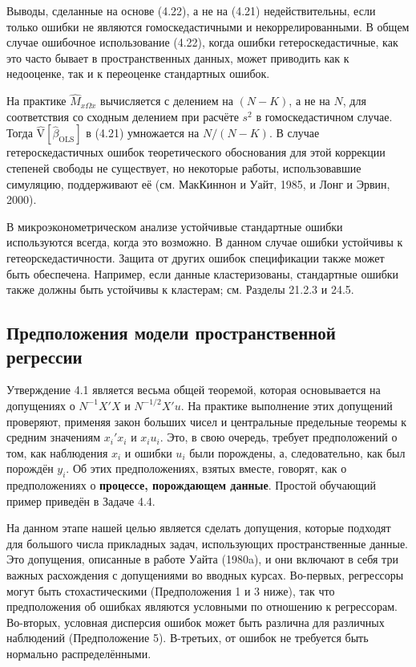 Выводы, сделанные на основе (4.22), а не на (4.21) недействительны, если только ошибки не являются гомоскедастичными и некоррелированными. В общем случае ошибочное использование (4.22), когда ошибки гетероскедастичные, как это часто бывает в пространственных данных, может приводить как к недооценке, так и к переоценке стандартных ошибок.

На практике $\hat{M}_{x \Omega x}$ вычисляется с делением на $(N-K)$, а не на $N$, для соответствия со сходным делением при расчёте $s^2$ в гомоскедастичном случае. Тогда $\mathrm{\hat{V}}[\hat{\beta}_{\text{OLS}}]$ в (4.21) умножается на $N/(N-K)$. В случае гетероскедастичных ошибок теоретического обоснования для этой коррекции степеней свободы не существует, но некоторые работы, использовавшие симуляцию, поддерживают её (см. МакКиннон и Уайт, 1985, и Лонг и Эрвин, 2000).

В микроэконометрическом анализе устойчивые стандартные ошибки используются всегда, когда это возможно. В данном случае ошибки устойчивы к гетеорскедастичности. Защита от других ошибок спецификации также может быть обеспечена. Например, если данные кластеризованы, стандартные ошибки также должны быть устойчивы к кластерам; см. Разделы 21.2.3 и 24.5.

\subsection{Предположения модели пространственной регрессии}

Утверждение 4.1 является весьма общей теоремой, которая основывается на допущениях о $N^{-1}X'X$ и $N^{-1/2}X'u$. На практике выполнение этих допущений проверяют, применяя закон больших чисел и центральные предельные теоремы к средним значениям $x_i'x_i$ и $x_i u_i$. Это, в свою очередь, требует предположений о том, как наблюдения $x_i$ и ошибки $u_i$ были порождены, а, следовательно, как был порождён $y_i$. Об этих предположениях, взятых вместе, говорят, как о предположениях о \textbf{процессе, порождающем данные}. Простой обучающий пример приведён в Задаче 4.4.

На данном этапе нашей целью является сделать допущения, которые подходят для большого числа прикладных задач, использующих пространственные данные. Это допущения, описанные в работе Уайта (1980a), и они включают в себя три важных расхождения с допущениями во вводных курсах. Во-первых, регрессоры могут быть стохастическими (Предположения 1 и 3 ниже), так что предположения об ошибках являются условными по отношению к регрессорам. Во-вторых, условная дисперсия ошибок может быть различна для различных наблюдений (Предположение 5). В-третьих, от ошибок не требуется быть нормально распределёнными.

